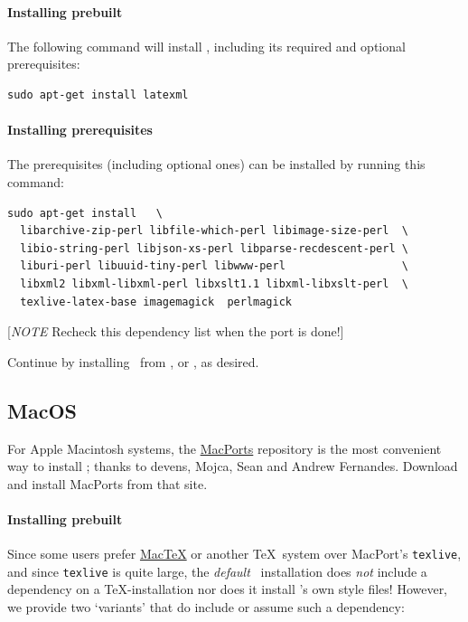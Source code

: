 \documentclass{article}
\begin{document}
\paragraph{Installing prebuilt}
The following command will install \LaTeXML, including its required
and optional prerequisites:
\begin{lstlisting}[style=shell]
sudo apt-get install latexml
\end{lstlisting}

\paragraph{Installing prerequisites}\label{install.deb.prereq}
The prerequisites (including optional ones) can be installed
by running this command: 
\begin{lstlisting}[style=shell]
sudo apt-get install   \
  libarchive-zip-perl libfile-which-perl libimage-size-perl  \
  libio-string-perl libjson-xs-perl libparse-recdescent-perl \
  liburi-perl libuuid-tiny-perl libwww-perl                  \
  libxml2 libxml-libxml-perl libxslt1.1 libxml-libxslt-perl  \
  texlive-latex-base imagemagick  perlmagick
\end{lstlisting}
[\emph{NOTE} Recheck this dependency list when the port is done!]

Continue by installing \LaTeXML\ from
\htmlref{tarball}{install.tarball}, 
or , as desired.

\subsection{MacOS}\label{install.mac}
For Apple Macintosh systems, the  \href{http://www.macports.org}{MacPorts}
repository is the most convenient way to install \LaTeXML;
thanks to devens, Mojca, Sean and Andrew Fernandes.
Download and install MacPorts from that site.

\paragraph{Installing prebuilt}
Since some users prefer \href{http://tug.org/mactex/}{MacTeX} or another
\TeX\ system over MacPort's \texttt{texlive}, and since \texttt{texlive} is quite large,
the \emph{default} \LaTeXML\ installation does \emph{not} include a dependency
on a \TeX-installation nor does it install \LaTeXML's own style files!
However, we provide two `variants' that do include or assume such a dependency:
\end{document}
